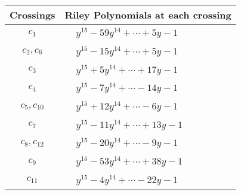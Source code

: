 \documentclass[1p]{elsarticle_modified}
\theoremstyle{definition}
\begin{document}
\begin{tabular}{m{50pt}|m{274pt}}
Crossings & \hspace{64pt}Riley Polynomials at each crossing \\
\hline $$\begin{aligned}c_{1}\end{aligned}$$&$\begin{aligned}
&y^{15}-59 y^{14}+\cdots+5 y-1
\end{aligned}$\\
\hline $$\begin{aligned}c_{2},c_{6}\end{aligned}$$&$\begin{aligned}
&y^{15}-15 y^{14}+\cdots+5 y-1
\end{aligned}$\\
\hline $$\begin{aligned}c_{3}\end{aligned}$$&$\begin{aligned}
&y^{15}+5 y^{14}+\cdots+17 y-1
\end{aligned}$\\
\hline $$\begin{aligned}c_{4}\end{aligned}$$&$\begin{aligned}
&y^{15}-7 y^{14}+\cdots-14 y-1
\end{aligned}$\\
\hline $$\begin{aligned}c_{5},c_{10}\end{aligned}$$&$\begin{aligned}
&y^{15}+12 y^{14}+\cdots-6 y-1
\end{aligned}$\\
\hline $$\begin{aligned}c_{7}\end{aligned}$$&$\begin{aligned}
&y^{15}-11 y^{14}+\cdots+13 y-1
\end{aligned}$\\
\hline $$\begin{aligned}c_{8},c_{12}\end{aligned}$$&$\begin{aligned}
&y^{15}-20 y^{14}+\cdots-9 y-1
\end{aligned}$\\
\hline $$\begin{aligned}c_{9}\end{aligned}$$&$\begin{aligned}
&y^{15}-53 y^{14}+\cdots+38 y-1
\end{aligned}$\\
\hline $$\begin{aligned}c_{11}\end{aligned}$$&$\begin{aligned}
&y^{15}-4 y^{14}+\cdots-22 y-1
\end{aligned}$\\
\hline
\end{tabular}\\~\\
\end{document}
